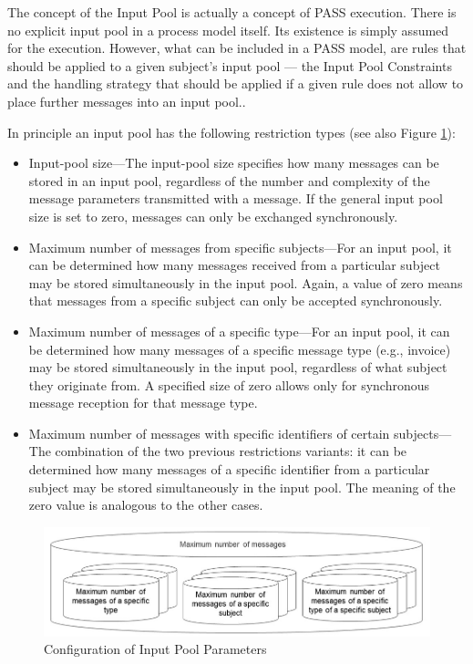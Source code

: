 The concept of the Input Pool is actually a concept of PASS execution. There is no explicit input pool in a process model itself. Its existence is simply assumed for the execution. However, what can be included in a PASS model, are rules that should be applied to a given subject's input pool --- the Input Pool Constraints and the handling strategy that should be applied if a given rule does not allow to place further messages into an input pool..

In principle an input pool has the following restriction types (see also Figure \ref{fig:input-pool}):

\begin{itemize}
	\item Input-pool size---The input-pool size specifies how many messages can be stored in an input pool, regardless of the number and complexity of the message parameters transmitted with a message. If the general input pool size is set to zero, messages can only be exchanged synchronously.
	\item Maximum number of messages from specific subjects---For an input pool, it can be determined how many messages received from a particular subject may be stored simultaneously in the input pool. Again, a value of zero means that messages from a specific subject can only be accepted synchronously.
	\item Maximum number of messages of a specific type---For an input pool, it can be determined how many messages of a specific message type (e.g., invoice) may be stored simultaneously in the input pool, regardless of what subject they originate from. A specified size of zero allows only for synchronous message reception for that message type.
	\item Maximum number of messages with specific identifiers of certain subjects--- The combination of the two previous restrictions variants: it can be determined how many messages of a specific identifier from a particular subject may be stored simultaneously in the input pool. The meaning of the zero value is analogous to the other cases.
\end{itemize}

\begin{figure}[htbp]
	\centering
	\includegraphics[width=12cm]{Figures/Ontology/SubjectInteraction/input-pool-informal.jpg}
	\caption[Input Pool]{Configuration of Input Pool Parameters}
	\label{fig:input-pool}
\end{figure}

